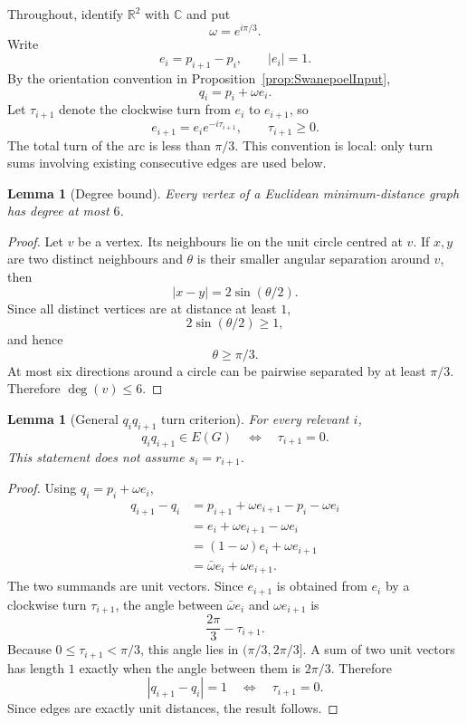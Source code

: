 \documentclass[11pt]{article}
\newtheorem{lemma}[theorem]{Lemma}
\newcommand{\RR}{\mathbb{R}}
\newcommand{\CC}{\mathbb{C}}
\begin{document}
Throughout, identify $\RR^2$ with $\CC$ and put
\[
 \omega=e^{i\pi/3}.
\]
Write
\[
 e_i=p_{i+1}-p_i,
 \qquad |e_i|=1.
\]
By the orientation convention in Proposition~\ref{prop:SwanepoelInput},
\[
 q_i=p_i+\omega e_i.
\]
Let $\tau_{i+1}$ denote the clockwise turn from $e_i$ to $e_{i+1}$, so
\[
 e_{i+1}=e_i e^{-i\tau_{i+1}},
 \qquad \tau_{i+1}\ge0.
\]
The total turn of the arc is less than $\pi/3$. This convention is local: only turn sums involving existing consecutive edges are used below.

\begin{lemma}[Degree bound]\label{lem:degree6}
Every vertex of a Euclidean minimum-distance graph has degree at most $6$.
\end{lemma}

\begin{proof}
Let $v$ be a vertex. Its neighbours lie on the unit circle centred at $v$. If $x,y$ are two distinct neighbours and $\theta$ is their smaller angular separation around $v$, then
\[
 |x-y|=2\sin(\theta/2).
\]
Since all distinct vertices are at distance at least $1$,
\[
 2\sin(\theta/2)\ge1,
\]
and hence
\[
 \theta\ge \pi/3.
\]
At most six directions around a circle can be pairwise separated by at least $\pi/3$. Therefore $\deg(v)\le6$.
\end{proof}

\begin{lemma}[General $q_iq_{i+1}$ turn criterion]\label{lem:q-turn}
For every relevant $i$,
\[
 q_iq_{i+1}\in E(G)
 \quad\Longleftrightarrow\quad
 \tau_{i+1}=0.
\]
This statement does not assume $s_i=r_{i+1}$.
\end{lemma}

\begin{proof}
Using $q_i=p_i+\omega e_i$,
\[
\begin{aligned}
 q_{i+1}-q_i
 &=p_{i+1}+\omega e_{i+1}-p_i-\omega e_i\\
 &=e_i+\omega e_{i+1}-\omega e_i\\
 &=(1-\omega)e_i+\omega e_{i+1}\\
 &=\bar\omega e_i+\omega e_{i+1}.
\end{aligned}
\]
The two summands are unit vectors. Since $e_{i+1}$ is obtained from $e_i$ by a clockwise turn $\tau_{i+1}$, the angle between $\bar\omega e_i$ and $\omega e_{i+1}$ is
\[
 \frac{2\pi}{3}-\tau_{i+1}.
\]
Because $0\le \tau_{i+1}<\pi/3$, this angle lies in $(\pi/3,2\pi/3]$. A sum of two unit vectors has length $1$ exactly when the angle between them is $2\pi/3$. Therefore
\[
 |q_{i+1}-q_i|=1
 \quad\Longleftrightarrow\quad
 \tau_{i+1}=0.
\]
Since edges are exactly unit distances, the result follows.
\end{proof}
\end{document}
